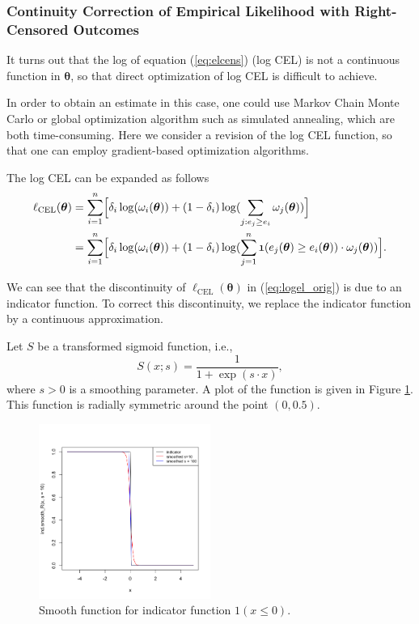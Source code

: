 \documentclass[article]{jss}
\renewcommand{\|}{\,|\,}
\begin{document}
\hypertarget{continuity-correction-of-empirical-likelihood-with-right-censored-outcomes}{%
\subsubsection{Continuity Correction of Empirical Likelihood with Right-Censored Outcomes}\label{continuity-correction-of-empirical-likelihood-with-right-censored-outcomes}}

It turns out that the log of equation (\ref{eq:elcens}) (log CEL) is not a continuous function in \(\bm \theta\), so that direct optimization of log CEL is difficult to achieve.

In order to obtain an estimate in this case, one could use Markov Chain Monte Carlo or global optimization algorithm such as simulated annealing, which are both time-consuming. Here we consider a revision of the log CEL function, so that one can employ gradient-based optimization algorithms.

The log CEL can be expanded as follows
\begin{equation}
\begin{split}
\ell_{\textrm{CEL}}(\bm \theta) &= \sum_{i=1}^n \Bigl[\delta_i\log(\omega_i(\bm \theta)) +
  (1-\delta_i)\log(\sum_{j:e_j \geq e_i} \omega_j(\bm \theta))\Bigr] \\
  &= \sum_{i=1}^n \Bigl[\delta_i\log(\omega_i(\bm \theta)) +
    (1-\delta_i)\log(\sum_{j=1}^n \mathfrak 1(e_j(\bm \theta) \geq e_i(\bm \theta)) \cdot \omega_j(\bm \theta))\Bigr].
\end{split}
\label{eq:logel_orig}
\end{equation}

We can see that the discontinuity of \(\ell_{\textrm{CEL}}(\bm \theta)\) in (\ref{eq:logel_orig}) is due to an indicator function. To correct this discontinuity, we replace the indicator function by a continuous approximation.

Let \(S\) be a transformed sigmoid function, i.e.,
\begin{equation}\label{eq:sigmoid}
  S(x; s) = \frac{1}{1+\exp(s\cdot x)},
\end{equation}
where \(s > 0\) is a smoothing parameter. A plot of the function is given in Figure \ref{fig:smoothfun}. This function is radially symmetric around the point \((0,0.5)\).

\begin{figure}[hbt!]
\centering
\includegraphics[width=0.5\textwidth]{smoothfun}
\caption{Smooth function for indicator function $\mathfrak 1(x\leq 0)$.}
\label{fig:smoothfun}
\end{figure}
\end{document}
